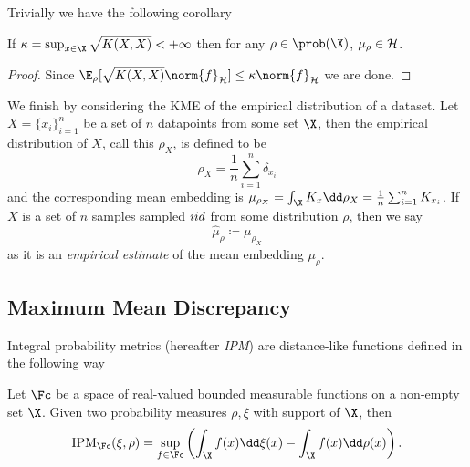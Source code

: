 Trivially we have the following corollary
\begin{corollary} If \(\kappa = \sup_{x \in \X}\sqrt{K(X, X)} < +\infty\) then
for any \(\rho \in \prob(\X)\), \(\mu_{\rho} \in \mathcal{H}\).
\end{corollary}

\begin{proof} Since \(\E_{\rho}[\sqrt{K(X, X)} \norm{f}_{\rkhs{H}}] \leq \kappa
\norm{f}_{\rkhs{H}}\) we are done.
\end{proof}

We finish by considering the KME of the empirical distribution of a dataset. Let
\(X = \{x_{i}\}_{i=1}^{n}\) be a set of \(n\) datapoints from some set
\(\X\), then the empirical distribution of \(X\), call this \(\rho_{X}\), is
defined to be
\begin{equation*}
  \label{eq:empirical-distribution}
  \rho_{X} = \frac{1}{n}\sum_{i=1}^{n} \delta_{x_{i}}
\end{equation*} and the corresponding mean embedding is \(\mu_{\rho_{X}} =
\int_{\X} K_{x} \dd \rho_{X} = \frac{1}{n} \sum_{i=1}^{n}K_{x_{i}}\). If \(X\) is
a set of \(n\) samples sampled \(iid\) from some distribution \(\rho\), then
we say
\begin{equation*}
\label{eq:empirical-kernel-mean-embedding} \hat{\mu}_{\rho} \coloneqq
\mu_{\rho_{X}}
\end{equation*} as it is an \emph{empirical estimate} of the mean embedding
\(\mu_{\rho}\).

\subsection{Maximum Mean Discrepancy} Integral probability metrics (hereafter
\emph{IPM}) \citep{mueller97_integ_probab_metric_their_gener_class_funct} are
distance-like functions defined in the following way
\begin{definition}
\label{def:IPM} Let \(\Fc\) be a space of real-valued bounded measurable
functions on a non-empty set \(\X\). Given two probability measures \(\rho,
\xi\) with support of \(\X\), then
  \begin{equation*}
    \label{eq:IPM} \mathrm{IPM}_{\Fc}(\xi, \rho) = \sup_{f \in \Fc}\left(
\int_{\X}f(x) \dd \xi(x) - \int_{\X}f(x) \dd \rho(x) \right).
  \end{equation*}
\end{definition}

